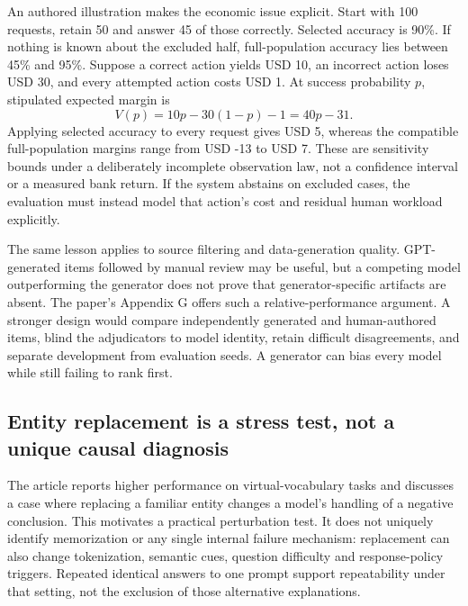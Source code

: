 An authored illustration makes the economic issue explicit. Start with 100 requests, retain 50 and answer 45 of those correctly. Selected accuracy is 90\%. If nothing is known about the excluded half, full-population accuracy lies between 45\% and 95\%. Suppose a correct action yields USD 10, an incorrect action loses USD 30, and every attempted action costs USD 1. At success probability $p$, stipulated expected margin is
\begin{equation}
 V(p)=10p-30(1-p)-1=40p-31.
 \label{exec21:check-value}
\end{equation}
Applying selected accuracy to every request gives USD 5, whereas the compatible full-population margins range from USD -13 to USD 7. These are sensitivity bounds under a deliberately incomplete observation law, not a confidence interval or a measured bank return. If the system abstains on excluded cases, the evaluation must instead model that action's cost and residual human workload explicitly.~\citep{exec21_causalitycheck_reference}

The same lesson applies to source filtering and data-generation quality. GPT-generated items followed by manual review may be useful, but a competing model outperforming the generator does not prove that generator-specific artifacts are absent. The paper's Appendix G offers such a relative-performance argument. A stronger design would compare independently generated and human-authored items, blind the adjudicators to model identity, retain difficult disagreements, and separate development from evaluation seeds. A generator can bias every model while still failing to rank first.~\citep{exec21_causalitycheck}

\subsection{Entity replacement is a stress test, not a unique causal diagnosis}
\label{exec21:check-rename}
The article reports higher performance on virtual-vocabulary tasks and discusses a case where replacing a familiar entity changes a model's handling of a negative conclusion. This motivates a practical perturbation test. It does not uniquely identify memorization or any single internal failure mechanism: replacement can also change tokenization, semantic cues, question difficulty and response-policy triggers. Repeated identical answers to one prompt support repeatability under that setting, not the exclusion of those alternative explanations.~\citep{exec21_causalitycheck}

